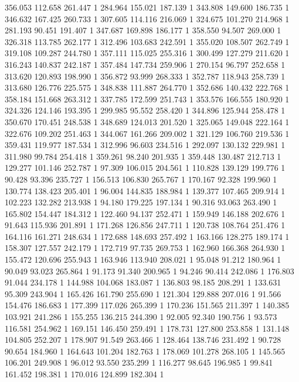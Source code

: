 	356.053	112.658	261.447	1
	284.964	155.021	187.139	1
	343.808	149.600	186.735	1
	346.632	167.425	260.733	1
	307.605	114.116	216.069	1
	324.675	101.270	214.968	1
	281.193	90.451	191.407	1
	347.687	169.898	186.177	1
	358.550	94.507	269.000	1
	326.318	113.785	262.177	1
	312.496	103.683	242.591	1
	355.020	108.507	262.749	1
	319.108	109.287	244.780	1
	357.111	115.025	255.316	1
	300.499	127.279	211.620	1
	316.243	140.837	242.187	1
	357.484	147.734	259.906	1
	270.154	96.797	252.658	1
	313.620	120.893	198.990	1
	356.872	93.999	268.333	1
	352.787	118.943	258.739	1
	313.680	126.776	225.575	1
	348.838	111.887	264.770	1
	352.686	140.432	222.768	1
	358.184	151.668	263.312	1
	337.785	172.599	251.743	1
	353.576	166.555	180.920	1
	324.326	124.146	193.395	1
	299.985	95.552	258.420	1
	344.896	125.944	258.478	1
	350.670	170.451	248.538	1
	348.689	124.013	201.520	1
	325.065	149.048	222.164	1
	322.676	109.202	251.463	1
	344.067	161.266	209.002	1
	321.129	106.760	219.536	1
	359.431	119.977	187.534	1
	312.996	96.603	234.516	1
	292.097	130.132	229.981	1
	311.980	99.784	254.418	1
	359.261	98.240	201.935	1
	359.448	130.487	212.713	1
	129.277	101.146	252.787	1
	97.309	106.015	204.561	1
	110.828	139.129	199.776	1
	90.428	93.396	235.727	1
	156.513	106.830	265.767	1
	170.167	92.328	199.960	1
	130.774	138.423	205.401	1
	96.004	144.835	188.984	1
	139.377	107.465	209.914	1
	102.223	132.282	213.938	1
	94.180	179.225	197.134	1
	90.316	93.063	263.490	1
	165.802	154.447	184.312	1
	122.460	94.137	252.471	1
	159.949	146.188	202.676	1
	91.643	115.936	201.891	1
	171.268	126.856	247.711	1
	120.738	108.764	251.476	1
	164.116	161.271	248.634	1
	172.688	148.693	257.492	1
	163.166	128.275	189.174	1
	158.307	127.557	242.179	1
	172.719	97.735	269.753	1
	162.960	166.368	264.930	1
	155.472	120.696	255.943	1
	163.946	113.940	208.021	1
	95.048	91.212	180.964	1
	90.049	93.023	265.864	1
	91.173	91.340	200.965	1
	94.246	90.414	242.086	1
	176.803	91.044	234.178	1
	144.988	104.068	183.087	1
	136.803	98.185	208.291	1
	133.631	95.309	243.904	1
	165.426	161.790	255.690	1
	121.304	129.888	207.016	1
	91.566	154.476	186.683	1
	177.399	117.026	265.399	1
	170.236	151.565	211.397	1
	140.385	103.921	241.286	1
	155.255	136.215	244.390	1
	92.005	92.340	190.756	1
	93.573	116.581	254.962	1
	169.151	146.450	259.491	1
	178.731	127.800	253.858	1
	131.148	104.805	252.207	1
	178.907	91.549	263.466	1
	128.464	138.746	231.492	1
	90.728	90.654	184.960	1
	164.643	101.204	182.763	1
	178.069	101.278	268.105	1
	145.565	106.201	249.908	1
	96.012	93.550	235.299	1
	116.277	98.645	196.985	1
	99.841	161.452	198.381	1
	170.016	124.899	182.304	1

